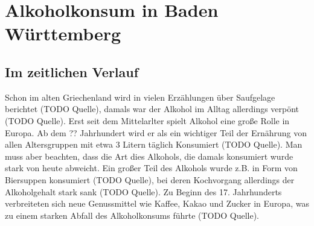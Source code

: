 \documentclass{article}
\begin{document}
\section{Alkoholkonsum in Baden Württemberg}



\subsection{Im zeitlichen Verlauf}
Schon im alten Griechenland wird in vielen Erzählungen über Saufgelage berichtet (TODO Quelle), damals war der Alkohol im Alltag allerdings verpönt (TODO Quelle). Erst seit dem Mittelarlter spielt Alkohol eine große Rolle in Europa. Ab dem ?? Jahrhundert wird er als ein wichtiger Teil der Ernährung von allen Altersgruppen mit etwa 3 Litern täglich Konsumiert (TODO Quelle). Man muss aber beachten, dass die Art dies Alkohols, die damals konsumiert wurde stark von heute abweicht. Ein großer Teil des Alkohols wurde z.B. in Form von Biersuppen konsumiert (TODO Quelle), bei deren Kochvorgang allerdings der Alkoholgehalt stark sank (TODO Quelle). Zu Beginn des 17. Jahrhunderts verbreiteten sich neue Genussmittel wie Kaffee, Kakao und Zucker in Europa, was zu einem starken Abfall des Alkoholkonsums führte (TODO Quelle).  
\end{document}
